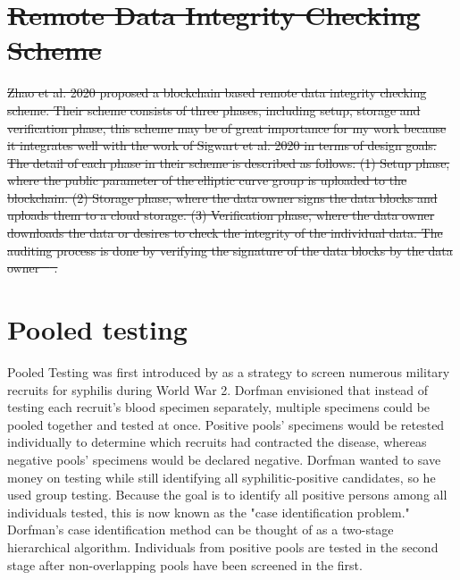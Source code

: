 \documentclass[final]{vutinfth}
\providecommand{\DIFdeltex}[1]{{\protect\color{red}\sout{#1}}}                      %
\providecommand{\DIFaddbegin}{} %
\providecommand{\DIFdelbegin}{} %
\providecommand{\DIFdelend}{} %
\providecommand{\DIFdel}[1]{\texorpdfstring{\DIFdeltex{#1}}{}} %
\begin{document}
\DIFdelbegin \section{\DIFdel{Remote Data Integrity Checking Scheme}}
\addtocounter{section}{-1}%
\DIFdel{Zhao et al. 2020 proposed a blockchain based remote data integrity checking scheme. Their scheme consists of three phases, including setup, storage and verification phase, this scheme may be of great importance for my work because it integrates well with the work of Sigwart et al. 2020 in terms of design goals. The detail of each phase in their scheme is described as follows: (1) Setup phase, where the public parameter of the elliptic curve group is uploaded to the blockchain. (2) Storage phase, where the data owner signs the data blocks and uploads them to a cloud storage.
(3) Verification phase, where the data owner downloads the data or desires to check the integrity of the individual data. The auditing process is done by verifying the signature of the data blocks by the data owner \mbox{%
\cite[1]{zhao2020blockchain}}\hskip0pt%
.
}%

\DIFdelend \section{Pooled testing}\label{sec:pooled}
Pooled Testing was first introduced by \cite{dorfman1943detection} as a strategy to screen numerous military recruits for syphilis during World War 2. Dorfman envisioned that instead of testing each recruit's blood specimen separately, multiple specimens could be pooled together and tested at once. Positive pools' specimens would be retested individually to determine which recruits had contracted the disease, whereas negative pools' specimens would be declared negative. Dorfman wanted to save money on testing while still identifying all syphilitic-positive candidates, so he used group testing. Because the goal is to identify all positive persons among all individuals tested, this is now known as the "case identification problem." Dorfman's case identification method can be thought of as a two-stage hierarchical algorithm. Individuals from positive pools are tested in the second stage after non-overlapping pools have been screened in the first.
\DIFaddbegin 
\end{document}
